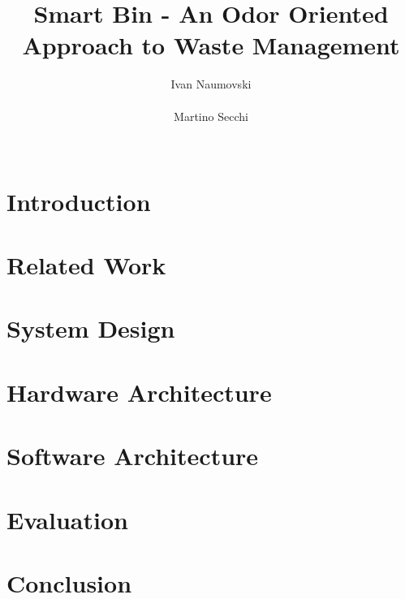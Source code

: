 \documentclass{sigchi}
\begin{document}
\title{Smart Bin - An Odor Oriented Approach to Waste Management}

\author{
  \alignauthor Ivan Naumovski\\
    \\
  \alignauthor Martino Secchi\\
    \\
}

\maketitle

\begin{abstract}

\end{abstract}




\section{Introduction}


\section{Related Work}


\section{System Design}


\section{Hardware Architecture}


\section{Software Architecture}


\section{Evaluation}


\section{Conclusion}




\end{document}
